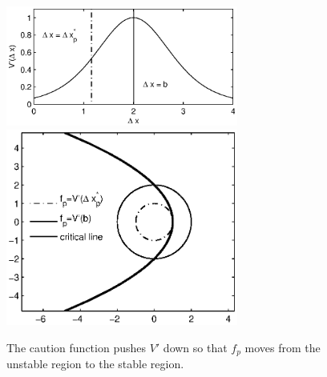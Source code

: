 \documentclass[10pt,twocolumn]{article}
\newcommand{\lm}{\fontfamily{\sfdefault}\selectfont}
\begin{document}
\begin{figure}[!h]
\lm
\begin{center}
\includegraphics[width=3in]{vopt_caution}
\includegraphics[width=3in]{ctrstbl}
\end{center}
\caption{ \label{fig:ctrstbl} The caution function pushes $V'$ down so that $f_p$ moves from the unstable region to the stable region.}
\end{figure}
\end{document}
